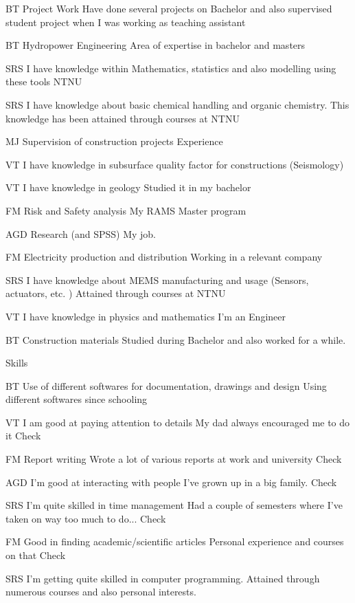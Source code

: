 BT
Project Work
Have done several projects on Bachelor and also supervised student project when I was working as teaching assistant


BT
Hydropower Engineering
Area of expertise in bachelor and masters


SRS
I have knowledge within Mathematics, statistics and also modelling using these tools
NTNU


SRS
I have knowledge about basic chemical handling and organic chemistry.
This knowledge has been attained through courses at NTNU

MJ
Supervision of construction projects
Experience

VT
I have knowledge in subsurface quality factor for constructions (Seismology)



VT
I have knowledge in geology
Studied it in my bachelor

FM
Risk and Safety analysis
My RAMS Master program


AGD
Research (and SPSS)
My job.

FM
Electricity production and distribution
Working in a relevant company

SRS
I have knowledge about MEMS manufacturing and usage (Sensors, actuators, etc. )
Attained through courses at NTNU

VT
I have knowledge in physics and mathematics
I'm an Engineer


BT
Construction materials
Studied during Bachelor and also worked for a while.



Skills

BT
Use of different softwares for documentation, drawings and design
Using different softwares since schooling

VT
I am good at paying attention to details
My dad always encouraged me to do it
Check

FM
Report writing
Wrote a lot of various reports at work and university
Check


AGD
I'm good at interacting with people
I've grown up in a big family.
Check


SRS
I'm quite skilled in time management
Had a couple of semesters where I've taken on way too much to do...
Check

FM
Good in finding academic/scientific articles
Personal experience and courses on that
Check


SRS
I'm getting quite skilled in computer programming.
Attained through numerous courses and also personal interests.


